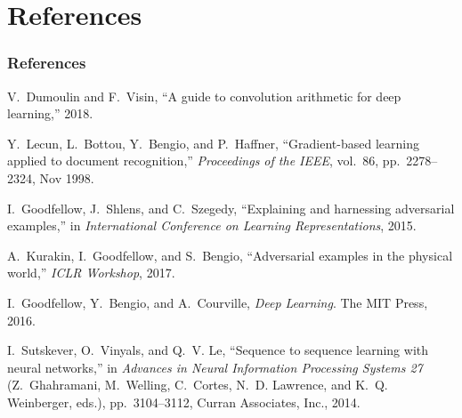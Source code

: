 \section{References}
\begin{frame}
\frametitle{References}
\footnotesize{
	\begin{thebibliography}{99}
		V.~Dumoulin and F.~Visin, ``A guide to convolution arithmetic for deep
		learning,'' 2018.
		
		Y.~{Lecun}, L.~{Bottou}, Y.~{Bengio}, and P.~{Haffner}, ``Gradient-based
		learning applied to document recognition,'' {\em Proceedings of the IEEE},
		vol.~86, pp.~2278--2324, Nov 1998.
		
		I.~Goodfellow, J.~Shlens, and C.~Szegedy, ``Explaining and harnessing
		adversarial examples,'' in {\em International Conference on Learning
			Representations}, 2015.
		
		A.~Kurakin, I.~Goodfellow, and S.~Bengio, ``Adversarial examples in the
		physical world,'' {\em ICLR Workshop}, 2017.
		
		I.~Goodfellow, Y.~Bengio, and A.~Courville, {\em Deep Learning}.
		\newblock The MIT Press, 2016.
		
		I.~Sutskever, O.~Vinyals, and Q.~V. Le, ``Sequence to sequence learning with
		neural networks,'' in {\em Advances in Neural Information Processing Systems
			27} (Z.~Ghahramani, M.~Welling, C.~Cortes, N.~D. Lawrence, and K.~Q.
		Weinberger, eds.), pp.~3104--3112, Curran Associates, Inc., 2014.
	\end{thebibliography}
}
\end{frame}

